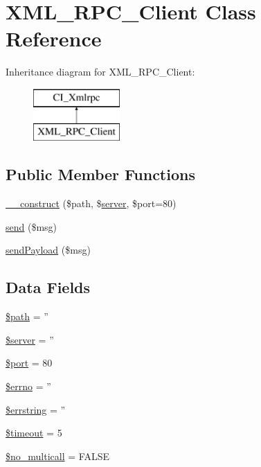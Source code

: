 \hypertarget{class_x_m_l___r_p_c___client}{\section{X\-M\-L\-\_\-\-R\-P\-C\-\_\-\-Client Class Reference}
\label{class_x_m_l___r_p_c___client}
}
Inheritance diagram for X\-M\-L\-\_\-\-R\-P\-C\-\_\-\-Client\-:\begin{figure}[H]
\begin{center}
\leavevmode
\includegraphics[height=2.000000cm]{class_x_m_l___r_p_c___client}
\end{center}
\end{figure}
\subsection*{Public Member Functions}
\begin{DoxyCompactItemize}
\item 
\hyperlink{class_x_m_l___r_p_c___client_aa49b8af3567ee5e448ae73fd69acb8c4}{\-\_\-\-\_\-construct} (\$path, \$\hyperlink{class_c_i___xmlrpc_a73157f1025c772bfa2c8c710aea1ae1f}{server}, \$port=80)
\item 
\hyperlink{class_x_m_l___r_p_c___client_a10284ca4704ff9e94185f95baa21973f}{send} (\$msg)
\item 
\hyperlink{class_x_m_l___r_p_c___client_a040f0b8dcbcaac6a33ca0541befed955}{send\-Payload} (\$msg)
\end{DoxyCompactItemize}
\subsection*{Data Fields}
\begin{DoxyCompactItemize}
\item 
\hyperlink{class_x_m_l___r_p_c___client_a0a4baf0b22973c07685c3981f0d17fc4}{\$path} = ''
\item 
\hyperlink{class_x_m_l___r_p_c___client_ad135cc8a47e55f0829949cf62214170f}{\$server} = ''
\item 
\hyperlink{class_x_m_l___r_p_c___client_aa0787efab4b22e8a212882f3409d4c77}{\$port} = 80
\item 
\hyperlink{class_x_m_l___r_p_c___client_a2be10a914e39a6b1f855ddf3b9a21367}{\$errno} = ''
\item 
\hyperlink{class_x_m_l___r_p_c___client_ac0e00fea1b952868a67648a9442a58da}{\$errstring} = ''
\item 
\hyperlink{class_x_m_l___r_p_c___client_a84320a9bf3e591d7ae20dfcb0dfe6a0d}{\$timeout} = 5
\item 
\hyperlink{class_x_m_l___r_p_c___client_a77b58d3e00e1054158dc707e34334497}{\$no\-\_\-multicall} = F\-A\-L\-S\-E
\end{DoxyCompactItemize}


